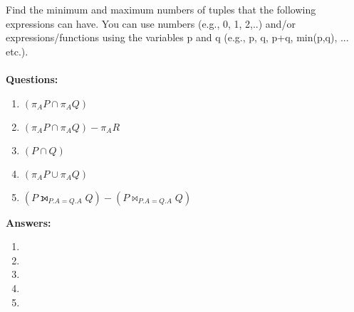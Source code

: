 \begin{questions}
Find the minimum and maximum numbers of tuples that the following expressions can have. You can use numbers (e.g., 0, 1, 2,..) and/or expressions/functions using the variables p and q (e.g., p, q, p+q, min(p,q), ... etc.). 
\\ \\

\textbf{Questions:}

\begin{enumerate}
    \item $(\pi_{A} P \cap \pi_{A} Q) $
    \item $(\pi_{A} P \cap \pi_{A} Q) - \pi_{A} R$
    \item $(P \cap Q) $
    \item $(\pi_{A} P \cup \pi_{A} Q) $
    \item $(P\leftouterjoin_{P.A=Q.A}Q) - (P\bowtie_{P.A=Q.A}Q)$
\end{enumerate}

\textbf{Answers:} 
\begin{enumerate}
    \item 
    \item 
    \item 
    \item 
    \item 
\end{enumerate}

\end{questions}
\bigskip 
\noindent



